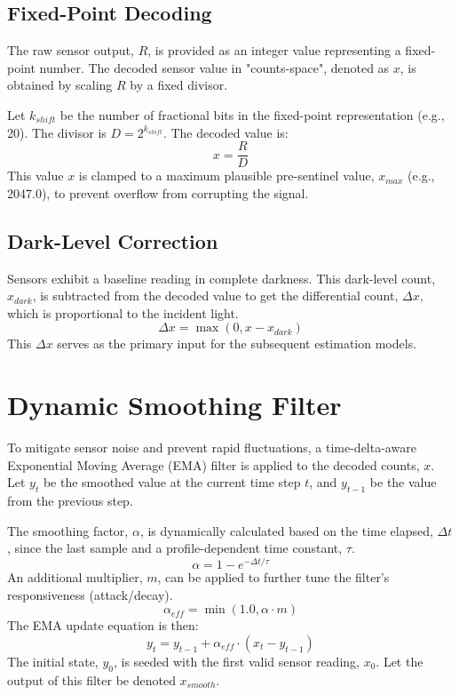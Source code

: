 \documentclass{article}
\begin{document}
\subsection{Fixed-Point Decoding}
The raw sensor output, $R$, is provided as an integer value representing a fixed-point number. The decoded sensor value in "counts-space", denoted as $x$, is obtained by scaling $R$ by a fixed divisor.

Let $k_{shift}$ be the number of fractional bits in the fixed-point representation (e.g., 20). The divisor is $D = 2^{k_{shift}}$. The decoded value is:
\begin{equation}
    x = \frac{R}{D}
\end{equation}
This value $x$ is clamped to a maximum plausible pre-sentinel value, $x_{max}$ (e.g., 2047.0), to prevent overflow from corrupting the signal.

\subsection{Dark-Level Correction}
Sensors exhibit a baseline reading in complete darkness. This dark-level count, $x_{dark}$, is subtracted from the decoded value to get the differential count, $\Delta x$, which is proportional to the incident light.
\begin{equation}
    \Delta x = \max(0, x - x_{dark})
\end{equation}
This $\Delta x$ serves as the primary input for the subsequent estimation models.

\section{Dynamic Smoothing Filter}
To mitigate sensor noise and prevent rapid fluctuations, a time-delta-aware Exponential Moving Average (EMA) filter is applied to the decoded counts, $x$. Let $y_t$ be the smoothed value at the current time step $t$, and $y_{t-1}$ be the value from the previous step.

The smoothing factor, $\alpha$, is dynamically calculated based on the time elapsed, $\Delta t$, since the last sample and a profile-dependent time constant, $\tau$.
\begin{equation}
    \alpha = 1 - e^{-\Delta t / \tau}
\end{equation}
An additional multiplier, $m$, can be applied to further tune the filter's responsiveness (attack/decay).
\begin{equation}
    \alpha_{eff} = \min(1.0, \alpha \cdot m)
\end{equation}
The EMA update equation is then:
\begin{equation}
    y_t = y_{t-1} + \alpha_{eff} \cdot (x_t - y_{t-1})
\end{equation}
The initial state, $y_0$, is seeded with the first valid sensor reading, $x_0$. Let the output of this filter be denoted $x_{smooth}$.
\end{document}
